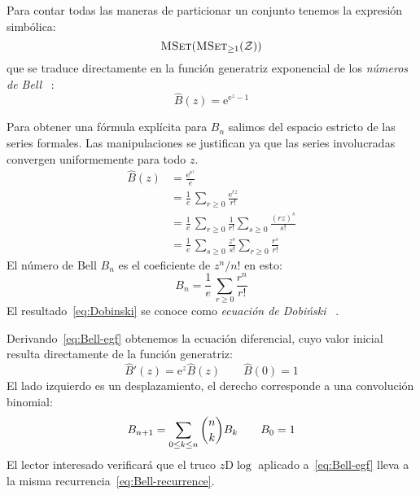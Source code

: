   Para contar todas las maneras de particionar un conjunto
  tenemos la expresión simbólica:
  \begin{equation*}
    \operatorname{\textsc{MSet}}(\operatorname{\textsc{MSet}}_{\ge 1}(\mathcal{Z}))
  \end{equation*}
  que se traduce directamente en la función generatriz exponencial
  de los \emph{números de Bell}~%
    \cite{bell34:_expon_number}:%
  \begin{equation}
    \label{eq:Bell-egf}
    \widehat{B}(z)
      = \mathrm{e}^{\mathrm{e}^z - 1}
  \end{equation}

  Para obtener una fórmula explícita para \(B_n\)
  salimos del espacio estricto de las series formales.
  Las manipulaciones se justifican ya que las series involucradas
  convergen uniformemente para todo \(z\).
  \begin{align*}
    \widehat{B}(z)
      &= \frac{\mathrm{e}^{\mathrm{e}^z}}{e} \\
      &= \frac{1}{e}
	   \, \sum_{r \ge 0} \frac{\mathrm{e}^{r z}}{r!} \\
      &= \frac{1}{e} \, \sum_{r \ge 0} \frac{1}{r!}
			  \sum_{s \ge 0} \frac{(r z)^s}{s!} \\
      &= \frac{1}{e} \, \sum_{s \ge 0} \frac{z^s}{s!}
			  \sum_{r \ge 0} \frac{r^s}{r!}
  \end{align*}
  El número de Bell \(B_n\)
  es el coeficiente de \(z^n / n!\) en esto:
  \begin{equation}
    \label{eq:Dobinski}
    B_n
      = \frac{1}{e} \, \sum_{r \ge 0} \frac{r^n}{r!}
  \end{equation}
  El resultado~\eqref{eq:Dobinski}
  se conoce como \emph{ecuación de Dobiński}~%
    \cite{dobinski77:_summir_reihe}.%

  Derivando~\eqref{eq:Bell-egf}
  obtenemos la ecuación diferencial,
  cuyo valor inicial resulta directamente de la función generatriz:
  \begin{equation}
    \label{eq:Bell-egf-ode}
    \widehat{B}'(z)
      = \mathrm{e}^z \widehat{B}(z)
      \qquad \widehat{B}(0) = 1
  \end{equation}
  El lado izquierdo es un desplazamiento,
  el derecho corresponde a una convolución binomial:
  \begin{equation}
    \label{eq:Bell-recurrence}
    \index{Bell, numeros de@Bell, números de!recurrencia}
    B_{n + 1}
      = \sum_{0 \le k \le n} \binom{n}{k} B_k
      \qquad B_0 = 1
  \end{equation}
  El lector interesado verificará
  que el truco \(z \mathrm{D} \log\)
  aplicado a~\eqref{eq:Bell-egf}%
  lleva a la misma recurrencia~\eqref{eq:Bell-recurrence}.

